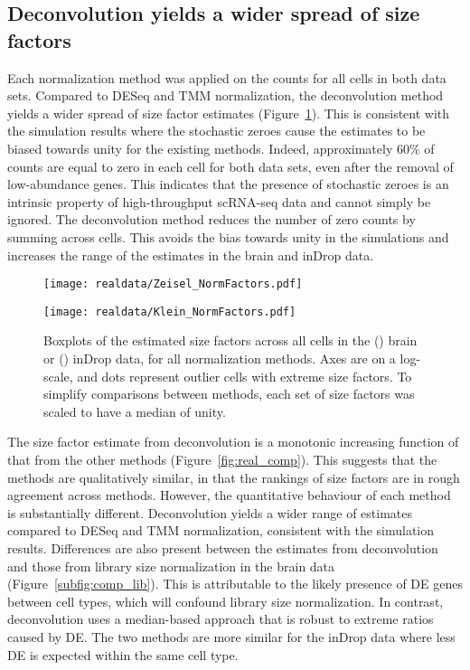 \documentclass{article}
\begin{document}
\subsection{Deconvolution yields a wider spread of size factors}
Each normalization method was applied on the counts for all cells in both data sets.
Compared to DESeq and TMM normalization, the deconvolution method yields a wider spread of size factor estimates (Figure~\ref{fig:real_spread}).
This is consistent with the simulation results where the stochastic zeroes cause the estimates to be biased towards unity for the existing methods.
Indeed, approximately 60\% of counts are equal to zero in each cell for both data sets, even after the removal of low-abundance genes.
This indicates that the presence of stochastic zeroes is an intrinsic property of high-throughput scRNA-seq data and cannot simply be ignored.
The deconvolution method reduces the number of zero counts by summing across cells.
This avoids the bias towards unity in the simulations and increases the range of the estimates in the brain and inDrop data.

\begin{figure}[btp]
    \begin{minipage}{0.48\textwidth}
        \texttt{[image: realdata/Zeisel\_NormFactors.pdf]}
        \subcaption{}\label{subfig:spread_brain}
    \end{minipage}
    \begin{minipage}{0.48\textwidth}
        \texttt{[image: realdata/Klein\_NormFactors.pdf]}
        \subcaption{}\label{subfig:spread_indrop}
    \end{minipage}
    \caption{
        Boxplots of the estimated size factors across all cells in the () brain or () inDrop data,
            for all normalization methods.
        Axes are on a log-scale, and dots represent outlier cells with extreme size factors.
        To simplify comparisons between methods, each set of size factors was scaled to have a median of unity.
    }
    \label{fig:real_spread}   
\end{figure}

The size factor estimate from deconvolution is a monotonic increasing function of that from the other methods (Figure~\ref{fig:real_comp}).
This suggests that the methods are qualitatively similar, in that the rankings of size factors are in rough agreement across methods.
However, the quantitative behaviour of each method is substantially different.
Deconvolution yields a wider range of estimates compared to DESeq and TMM normalization, consistent with the simulation results.
Differences are also present between the estimates from deconvolution and those from library size normalization in the brain data (Figure~\ref{subfig:comp_lib}).
This is attributable to the likely presence of DE genes between cell types, which will confound library size normalization.
In contrast, deconvolution uses a median-based approach that is robust to extreme ratios caused by DE.
The two methods are more similar for the inDrop data where less DE is expected within the same cell type.
\end{document}
